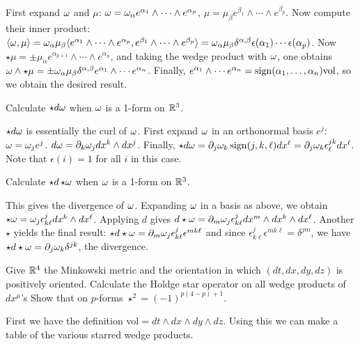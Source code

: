 First expand $\omega$ and $\mu$: $\omega=\omega_\alpha e^{\alpha_1}\wedge\cdots\wedge e^{\alpha_p}$, 
$\mu=\mu_\beta e^{\beta_1}\wedge\cdots\wedge e^{\beta_p}$. Now compute their inner product:
$\langle \omega,\mu\rangle=\omega_\alpha\mu_\beta\langle e^{\alpha_1}\wedge\cdots\wedge e^{\alpha_p}, 
e^{\beta_1}\wedge\cdots\wedge e^{\beta_p}\rangle=\omega_\alpha\mu_\beta\delta^{\alpha,\beta}\epsilon(\alpha_1)\cdots\epsilon(\alpha_p)$. 
Now $\star\mu=\pm\mu_\alpha e^{\alpha_{p+1}}\wedge\cdots\wedge 
e^{\alpha_n}$, and taking the wedge product with $\omega$, one obtains $\omega\wedge\star\mu=\pm\omega_\alpha\mu_\beta\delta^{\alpha,\beta}
e^{\alpha_1}\wedge\cdots e^{\alpha_n}$. Finally, $e^{\alpha_1}\wedge\cdots e^{\alpha_n}={\rm sign}(\alpha_1,\dots,\alpha_n){\rm vol}$, 
so we obtain the desired result.

\begin{p}{Calculate $\star d\omega$ when $\omega$ is a 1-form on $\mathbb{R}^3$.}\end{p}

$\star d\omega$ is essentially the curl of $\omega$. 
First expand $\omega$ in an orthonormal basis $e^j$: $\omega=\omega_je^j$. $d\omega=\partial_k\omega_j dx^k\wedge dx^j$. Finally, $\star d\omega=
\partial_j\omega_k\, {\rm sign}(j,k,\ell)dx^\ell=\partial_j\omega_k \epsilon^{jk}_\ell dx^\ell.$ Note that $\epsilon(i)=1$ for all $i$ in this case.

\begin{p}{Calculate $\star d\,{\star}\omega$ when $\omega$ is a 1-form on $\mathbb{R}^3$.}\end{p}

This gives the divergence of $\omega$. Expanding $\omega$ in a basis as above, we obtain $\star\omega=\omega_j\epsilon^j_{k\ell}dx^k\wedge dx^\ell$.
Applying $d$ gives $d\star\omega=\partial_m\omega_j\epsilon^j_{k\ell}dx^m\wedge dx^k\wedge dx^\ell$. Another $\star$ yields the final
result: $\star d\star\omega=\partial_m\omega_j\epsilon^j_{k\ell}\epsilon^{mk\ell}$ and since $\epsilon^j_{k\ell}\epsilon^{mk\ell}=\delta^{jm}$, we
have $\star d\star\omega=\partial_j\omega_k\delta^{jk}$, the divergence.

\begin{p}{Give $\mathbb{R}^4$ the Minkowski metric and the orientation in which
$(dt,dx,dy,dz)$ is positively oriented. Calculate the Holdge star operator on all wedge products of
$dx^\mu$'s Show that on $p$-forms $\star^2=(-1)^{p(4{-}p)+1}$.}
\end{p}

First we have the definition vol$=dt\wedge dx\wedge dy\wedge dz$. Using this we can make a table
of the various starred wedge products. 


